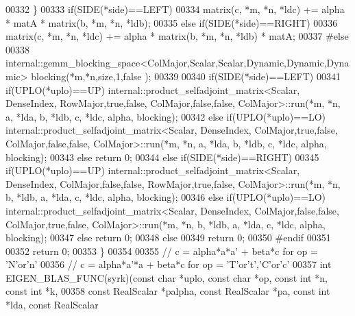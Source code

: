 \begin{DoxyCode}
00332   \}
00333   \textcolor{keywordflow}{if}(SIDE(*side)==LEFT)
00334     matrix(c, *m, *n, *ldc) += alpha * matA * matrix(b, *m, *n, *ldb);
00335   \textcolor{keywordflow}{else} \textcolor{keywordflow}{if}(SIDE(*side)==RIGHT)
00336     matrix(c, *m, *n, *ldc) += alpha * matrix(b, *m, *n, *ldb) * matA;
00337 \textcolor{preprocessor}{  #else}
00338   internal::gemm\_blocking\_space<ColMajor,Scalar,Scalar,Dynamic,Dynamic,Dynamic> blocking(*m,*n,size,1,\textcolor{keyword}{false}
      );
00339 
00340   \textcolor{keywordflow}{if}(SIDE(*side)==LEFT)
00341     \textcolor{keywordflow}{if}(UPLO(*uplo)==UP)       internal::product\_selfadjoint\_matrix<Scalar, DenseIndex, RowMajor,true,false,
       ColMajor,false,false, ColMajor>::run(*m, *n, a, *lda, b, *ldb, c, *ldc, alpha, blocking);
00342     \textcolor{keywordflow}{else} \textcolor{keywordflow}{if}(UPLO(*uplo)==LO)  internal::product\_selfadjoint\_matrix<Scalar, DenseIndex, ColMajor,true,false,
       ColMajor,false,false, ColMajor>::run(*m, *n, a, *lda, b, *ldb, c, *ldc, alpha, blocking);
00343     \textcolor{keywordflow}{else}                      \textcolor{keywordflow}{return} 0;
00344   \textcolor{keywordflow}{else} \textcolor{keywordflow}{if}(SIDE(*side)==RIGHT)
00345     \textcolor{keywordflow}{if}(UPLO(*uplo)==UP)       internal::product\_selfadjoint\_matrix<Scalar, DenseIndex,
       ColMajor,false,false, RowMajor,true,false, ColMajor>::run(*m, *n, b, *ldb, a, *lda, c, *ldc, alpha, blocking);
00346     \textcolor{keywordflow}{else} \textcolor{keywordflow}{if}(UPLO(*uplo)==LO)  internal::product\_selfadjoint\_matrix<Scalar, DenseIndex,
       ColMajor,false,false, ColMajor,true,false, ColMajor>::run(*m, *n, b, *ldb, a, *lda, c, *ldc, alpha, blocking);
00347     \textcolor{keywordflow}{else}                      \textcolor{keywordflow}{return} 0;
00348   \textcolor{keywordflow}{else}
00349     \textcolor{keywordflow}{return} 0;
00350 \textcolor{preprocessor}{  #endif}
00351 
00352   \textcolor{keywordflow}{return} 0;
00353 \}
00354 
00355 \textcolor{comment}{// c = alpha*a*a' + beta*c  for op = 'N'or'n'}
00356 \textcolor{comment}{// c = alpha*a'*a + beta*c  for op = 'T'or't','C'or'c'}
00357 \textcolor{keywordtype}{int} EIGEN\_BLAS\_FUNC(syrk)(\textcolor{keyword}{const} \textcolor{keywordtype}{char} *uplo, \textcolor{keyword}{const} \textcolor{keywordtype}{char} *op, \textcolor{keyword}{const} \textcolor{keywordtype}{int} *n, \textcolor{keyword}{const} \textcolor{keywordtype}{int} *k,
00358                           \textcolor{keyword}{const} RealScalar *palpha, \textcolor{keyword}{const} RealScalar *pa, \textcolor{keyword}{const} \textcolor{keywordtype}{int} *lda, \textcolor{keyword}{const} RealScalar 

\end{DoxyCode}
